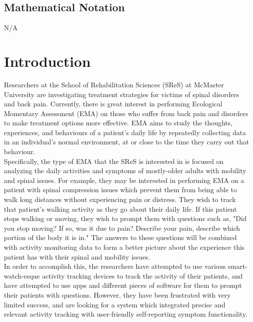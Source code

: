 \documentclass[12pt]{article}
\begin{document}
\subsection{Mathematical Notation}
N/A


\section{Introduction}

Researchers at the School of Rehabilitation Sciences (SReS) at McMaster University are investigating treatment strategies for victims of spinal disorders and back pain. Currently, there is great interest in performing Ecological Momentary Assessment (EMA) on those who suffer from back pain and disorders to make treatment options more effective. EMA aims to study the thoughts, experiences, and behaviours of a patient's daily life by repeatedly collecting data in an individual's normal environment, at or close to the time they carry out that behaviour.\\

Specifically, the type of EMA that the SReS is interested in is focused on analyzing the daily activities and symptoms of mostly-older adults with mobility and spinal issues. For example, they may be interested in performing EMA on a patient with spinal compression issues which prevent them from being able to walk long distances without experiencing pain or distress. They wish to track that patient's walking activity as they go about their daily life. If this patient stops walking or moving, they wish to prompt them with questions such as, "Did you stop moving? If so, was it due to pain? Describe your pain, describe which portion of the body it is in." The answers to these questions will be combined with activity monitoring data to form a better picture about the experience this patient has with their spinal and mobility issues.\\

In order to accomplish this, the researchers have attempted to use various smart-watch-esque activity tracking devices to track the activity of their patients, and have attempted to use apps and different pieces of software for them to prompt their patients with questions. However, they have been frustrated with very limited success, and are looking for a system which integrated precise and relevant activity tracking with user-friendly self-reporting symptom functionality.\\
\end{document}
